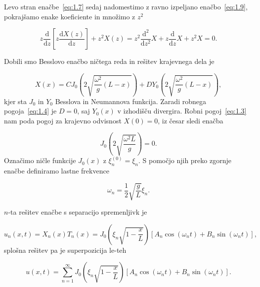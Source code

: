 Levo stran enačbe~\eqref{eq:1.7} sedaj nadomestimo z ravno izpeljano enačbo~\eqref{eq:1.9}, pokrajšamo enake koeficiente in množimo z \( z ^2 \)

\begin{equation}
\label{eq:1.10}
 z \frac{\mathrm{d} }{\mathrm{d} z} \left[ z \frac{\mathrm{d} X(z)}{\mathrm{d} z} \right] + z ^2 X(z) = z^2 \frac{\mathrm{d} ^2 }{\mathrm{d} z ^2} X + z \frac{\mathrm{d} }{\mathrm{d} z} X + z ^2 X = 0.
\end{equation}

Dobili smo Besslovo enačbo ničtega reda in rešitev krajevnega dela je

\[ X(x) = C J_0 \left( 2 \sqrt{\frac{\omega ^2}{g} (L- x)} \right) + D Y_0 \left( 2 \sqrt{\frac{\omega ^2}{g} (L - x)} \right),
\]
kjer sta \( J_0 \) in \( Y_0 \) Besslova in Neumannova funkcija. Zaradi robnega pogoja~\eqref{eq:1.4} je \( D =0 \), saj \( Y_0(x) \) v izhodišču divergira. Robni pogoj~\eqref{eq:1.3} nam poda pogoj za krajevno odvisnost \( X(0) = 0 \), iz česar sledi enačba

\[ J_0 \left( 2 \sqrt{\frac{\omega ^2 L}{g}} \right) = 0.
\]
Označimo ničle funkcije \( J_0(x) \) z \( \xi_n^{(0)} = \xi_n \). S pomočjo njih preko zgornje enačbe definiramo lastne frekvence

\[  \omega_n = \frac{1}{2} \sqrt{\frac{g}{L}} \xi_n.
\]

\( n \)-ta rešitev enačbe s separacijo spremenljivk je

\[ u_n(x, t) = X_n(x) T_n (x) =  J_0 \left( \xi_n \sqrt{1 - \frac{x}{L}} \right) \left[ A_n \cos \left( \omega_n t \right) + B_n \sin \left( \omega_n t \right) \right],
\]
splošna rešitev pa je superpozicija le-teh

\[ u(x, t) = \sum\limits_{n = 1}^{\infty} J_0  \left( \xi_n \sqrt{1 - \frac{x}{L}} \right) \left[ A_n \cos \left( \omega_n t \right) + B_n \sin \left( \omega_n t \right) \right].
\]

